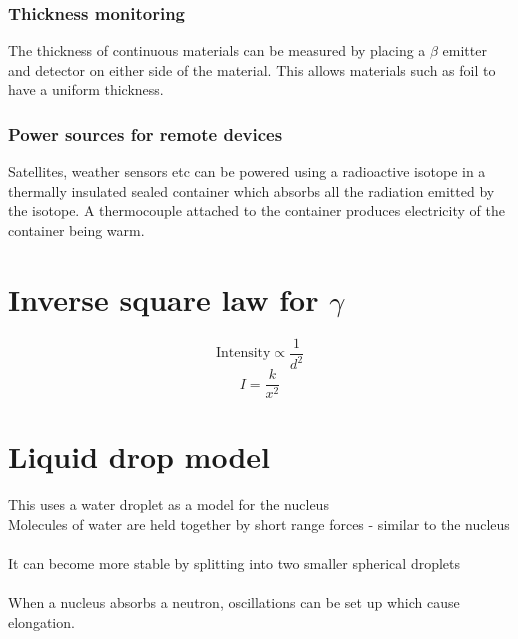 \documentclass{article}[18pt]
\begin{document}
\subsubsection{Thickness monitoring}
The thickness of continuous materials can be measured by placing a $\beta$ emitter and detector on either side of the material. This allows materials such as foil to have a uniform thickness.
\subsubsection{Power sources for remote devices}
Satellites, weather sensors etc can be powered using a radioactive isotope in a thermally insulated sealed container which absorbs all the radiation emitted by the isotope. A thermocouple attached to the container produces electricity of the container being warm.
\section{Inverse square law for $\gamma$}
$$\textrm{Intensity}\propto\frac{1}{d^2}$$
$$I=\frac{k}{x^2}$$
\section{Liquid drop model}
This uses a water droplet as a model for the nucleus\\
Molecules of water are held together by short range forces - similar to the nucleus\\
\\
It can become more stable by splitting into two smaller spherical droplets\\
\\
When a nucleus absorbs a neutron, oscillations can be set up which cause elongation.
\end{document}
